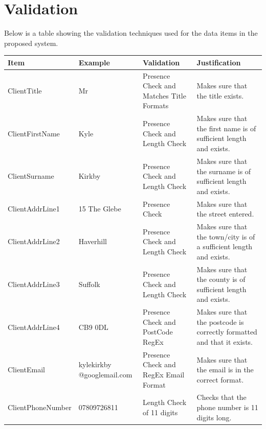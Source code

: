 \section{Validation}

\begin{flushleft}
Below is a table showing the validation techniques used for the data items in the proposed system.
\end{flushleft}

\begin{longtable}{|p{3cm}|p{3cm}|p{3cm}|p{3cm}|}
\hline \textbf{Item} & \textbf{Example} & \textbf{Validation} &\textbf{Justification} \\ \hline
ClientTitle & Mr & Presence Check and Matches Title Formats  & Makes sure that the title exists. \\ \hline
ClientFirstName & Kyle & Presence Check and Length Check & Makes sure that the first name is of sufficient length and exists. \\ \hline
ClientSurname & Kirkby & Presence Check and Length Check & Makes sure that the surname is of sufficient length and exists. \\ \hline
ClientAddrLine1 & 15 The Glebe & Presence Check & Makes sure that the street entered. \\ \hline
ClientAddrLine2 & Haverhill & Presence Check and Length Check & Makes sure that the town/city is of a sufficient length and exists. \\ \hline
ClientAddrLine3 & Suffolk & Presence Check and Length Check & Makes sure that the county is of sufficient length and exists. \\ \hline
ClientAddrLine4 & CB9 0DL & Presence Check and PostCode RegEx & Makes sure that the postcode is correctly formatted and that it exists. \\ \hline
ClientEmail & kylekirkby @googlemail.com & Presence Check and RegEx Email Format & Makes sure that the email is in the correct format. \\ \hline
ClientPhoneNumber & 07809726811 & Length Check of 11 digits & Checks that the phone number is 11 digits long. \\ \hline \hline



\end{longtable}
